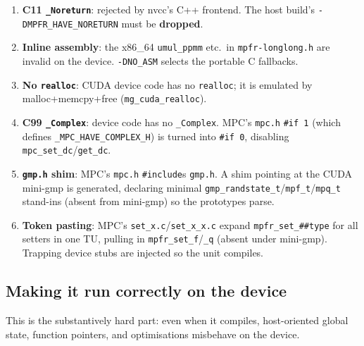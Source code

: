\documentclass[uplatex,dvipdfmx,a4paper,11pt]{jsarticle}
\newcommand{\code}[1]{\texttt{#1}}
\begin{document}
\begin{enumerate}
\item \textbf{C11 \code{\_Noreturn}}: rejected by nvcc's C++ frontend. The
      host build's \code{-DMPFR\_HAVE\_NORETURN} must be \textbf{dropped}.
\item \textbf{Inline assembly}: the x86\_64 \code{umul\_ppmm} etc.\ in
      \code{mpfr-longlong.h} are invalid on the device. \code{-DNO\_ASM} selects
      the portable C fallbacks.
\item \textbf{No \code{realloc}}: CUDA device code has no \code{realloc}; it is
      emulated by malloc+memcpy+free (\code{mg\_cuda\_realloc}).
\item \textbf{C99 \code{\_Complex}}: device code has no \code{\_Complex}. MPC's
      \code{mpc.h} \code{\#if 1} (which defines \code{\_MPC\_HAVE\_COMPLEX\_H}) is
      turned into \code{\#if 0}, disabling \code{mpc\_set\_dc}/\code{get\_dc}.
\item \textbf{\code{gmp.h} shim}: MPC's \code{mpc.h} \code{\#include}s
      \code{gmp.h}. A shim pointing at the CUDA mini-gmp is generated, declaring
      minimal \code{gmp\_randstate\_t}/\code{mpf\_t}/\code{mpq\_t} stand-ins (absent
      from mini-gmp) so the prototypes parse.
\item \textbf{Token pasting}: MPC's \code{set\_x.c}/\code{set\_x\_x.c} expand
      \code{mpfr\_set\_\#\#type} for all setters in one TU, pulling in
      \code{mpfr\_set\_f}/\code{\_q} (absent under mini-gmp). Trapping device stubs
      are injected so the unit compiles.
\end{enumerate}

\subsection{Making it run correctly on the device}

This is the substantively hard part: even when it compiles, host-oriented global
state, function pointers, and optimisations misbehave on the device.
\end{document}
